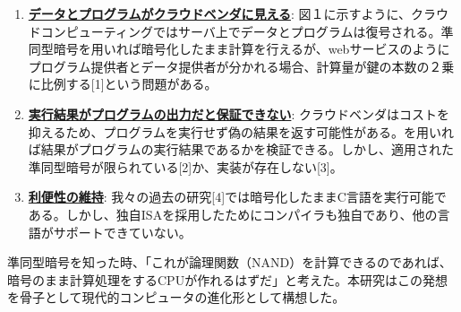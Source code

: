 \begin{enumerate}[label=(\roman*),leftmargin=0.5cm]
\setlength{\parskip}{0cm} %
\setlength{\itemsep}{0cm} %
    \item \underline{\textbf{データとプログラムがクラウドベンダに見える}}: 図１に示すように、クラウドコンピューティングではサーバ上でデータとプログラムは復号される。準同型暗号を用いれば暗号化したまま計算を行えるが、webサービスのようにプログラム提供者とデータ提供者が分かれる場合、計算量が鍵の本数の２乗に比例する[1]という問題がある。\label{prob:maliciousvender}
    \item  \underline{\textbf{実行結果がプログラムの出力だと保証できない}}: クラウドベンダはコストを抑えるため、プログラムを実行せず偽の結果を返す可能性がある。を用いれば結果がプログラムの実行結果であるかを検証できる。しかし、適用された準同型暗号が限られている[2]か、実装が存在しない[3]。\label{prob:verifiability}
    \item  \underline{\textbf{利便性の維持}}: 我々の過去の研究[4]では暗号化したままC言語を実行可能である。しかし、独自ISAを採用したためにコンパイラも独自であり、他の言語がサポートできていない。\label{prob:usability}
\end{enumerate}


準同型暗号を知った時、「これが論理関数（NAND）を計算できるのであれば、暗号のまま計算処理をするCPUが作れるはずだ」と考えた。本研究はこの発想を骨子として現代的コンピュータの進化形として構想した。




